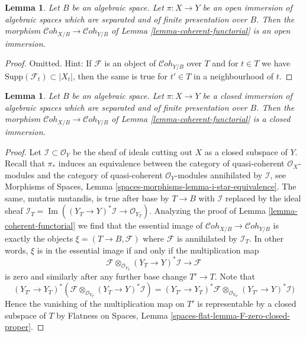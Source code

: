 \documentclass{stacks-project}
\theoremstyle{plain}
\newtheorem{lemma}[subsection]{Lemma}
\theoremstyle{definition}
\theoremstyle{remark}
\numberwithin{equation}{subsection}
\def\Im{\mathop{\mathrm{Im}}}
\def\Cohstack{\mathcal{C}\!\mathit{oh}}
\begin{document}
\begin{lemma}
\label{lemma-coherent-open}
Let $B$ be an algebraic space. Let $\pi : X \to Y$ be an open immersion
of algebraic spaces which are separated and of finite presentation over $B$.
Then the morphism $\Cohstack_{X/B} \to \Cohstack_{Y/B}$ of
Lemma \ref{lemma-coherent-functorial} is an open immersion.
\end{lemma}

\begin{proof}
Omitted. Hint: If $\mathcal{F}$ is an object of $\Cohstack_{Y/B}$ over $T$
and for $t \in T$ we have $\text{Supp}(\mathcal{F}_t) \subset |X_t|$,
then the same is true for $t' \in T$ in a neighbourhood of $t$.
\end{proof}

\begin{lemma}
\label{lemma-coherent-closed}
Let $B$ be an algebraic space. Let $\pi : X \to Y$ be a closed immersion
of algebraic spaces which are separated and of finite presentation over $B$.
Then the morphism $\Cohstack_{X/B} \to \Cohstack_{Y/B}$ of
Lemma \ref{lemma-coherent-functorial} is a closed immersion.
\end{lemma}

\begin{proof}
Let $\mathcal{I} \subset \mathcal{O}_Y$ be the sheaf of ideals cutting
out $X$ as a closed subspace of $Y$. Recall that $\pi_*$ induces
an equivalence between the category of quasi-coherent $\mathcal{O}_X$-modules
and the category of quasi-coherent $\mathcal{O}_Y$-modules annihilated
by $\mathcal{I}$, see Morphisms of Spaces, Lemma
\ref{spaces-morphisms-lemma-i-star-equivalence}.
The same, mutatis mutandis, is true after base by $T \to B$ with
$\mathcal{I}$ replaced by the ideal sheaf
$\mathcal{I}_T = \Im((Y_T \to Y)^*\mathcal{I} \to \mathcal{O}_{Y_T})$.
Analyzing the proof of Lemma \ref{lemma-coherent-functorial}
we find that the essential image of
$\Cohstack_{X/B} \to \Cohstack_{Y/B}$
is exactly the objects $\xi = (T \to B, \mathcal{F})$
where $\mathcal{F}$ is annihilated by $\mathcal{I}_T$.
In other words, $\xi$ is in the essential image if and only if
the multiplication map
$$
\mathcal{F} \otimes_{\mathcal{O}_{Y_T}} (Y_T \to Y)^*\mathcal{I}
\longrightarrow
\mathcal{F}
$$
is zero and similarly after any further base change $T' \to T$.
Note that
$$
(Y_{T'} \to Y_T)^*(
\mathcal{F} \otimes_{\mathcal{O}_{Y_T}} (Y_T \to Y)^*\mathcal{I}) =
(Y_{T'} \to Y_T)^*\mathcal{F} \otimes_{\mathcal{O}_{Y_{T'}}}
(Y_{T'} \to Y)^*\mathcal{I})
$$
Hence the vanishing of the multiplication map on $T'$
is representable by a closed subspace of $T$ by
Flatness on Spaces, Lemma \ref{spaces-flat-lemma-F-zero-closed-proper}.
\end{proof}
\end{document}
